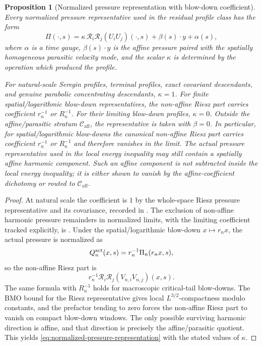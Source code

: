 \documentclass[11pt]{amsart}
\numberwithin{equation}{section}
\theoremstyle{plain}
\newtheorem{proposition}[proposition]{Proposition}
\theoremstyle{definition}
\theoremstyle{remark}
\newcommand{\Caff}{\mathcal C_{\mathrm{aff}}}
\begin{document}
\begin{proposition}[Normalized pressure representation with blow-down coefficient]
\label{prop:normalized-pressure-representation}
Every normalized pressure representative used in the residual profile class has
the form
\begin{equation}\label{eq:normalized-pressure-representation}
   \Pi(\cdot,s)
   =
   \kappa\,\mathcal R_i\mathcal R_j(U_iU_j)(\cdot,s)
   +\beta(s)\cdot y+\alpha(s),
\end{equation}
where \(\alpha\) is a time gauge, \(\beta(s)\cdot y\) is the affine pressure
paired with the spatially homogeneous parasitic velocity mode, and the scalar
\(\kappa\) is determined by the operation which produced the profile.

For natural-scale Seregin profiles, terminal profiles, exact covariant
descendants, and genuine parabolic concentrating descendants, \(\kappa=1\).
For finite spatial/logarithmic blow-down representatives, the non-affine Riesz
part carries coefficient \(r_n^{-1}\) or \(R_n^{-1}\).  For their limiting
blow-down profiles, \(\kappa=0\).  Outside the affine/parasitic
stratum \(\Caff\), the representative is taken with \(\beta=0\).  In
particular, for spatial/logarithmic blow-downs the canonical non-affine Riesz
part carries coefficient \(r_n^{-1}\) or \(R_n^{-1}\) and therefore vanishes in
the limit.  The actual pressure representative used in the local energy
inequality may still contain a spatially affine harmonic component.  Such an
affine component is not subtracted inside the local energy inequality; it is
either shown to vanish by the affine-coefficient dichotomy or routed to
\(\Caff\).
\end{proposition}

\begin{proof}
At natural scale the coefficient is \(1\) by the whole-space Riesz pressure
representative and its covariance, recorded in
.  The exclusion of non-affine
harmonic pressure remainders in normalized limits, with the limiting
coefficient tracked explicitly, is
.  Under the spatial/logarithmic
blow-down \(x\mapsto r_nx\), the actual pressure is normalized as
\[
   Q_n^{\rm act}(x,s)=r_n^{-1}\Pi_n(r_nx,s),
\]
so the non-affine Riesz part is
\[
   r_n^{-1}\mathcal R_i\mathcal R_j(V_{n,i}V_{n,j})(x,s).
\]
The same formula with \(R_n^{-1}\) holds for macroscopic critical-tail
blow-downs.  The BMO bound for the Riesz representative gives local
\(L^{3/2}\)-compactness modulo constants, and the prefactor tending to zero
forces the non-affine Riesz part to vanish on compact blow-down windows.  The
only possible surviving harmonic direction is affine, and that direction is
precisely the affine/parasitic quotient.  This yields
\eqref{eq:normalized-pressure-representation} with the stated values of
\(\kappa\).
\end{proof}
\end{document}
